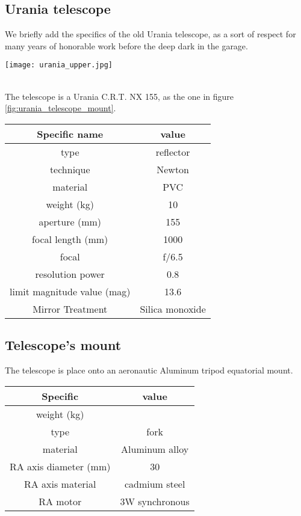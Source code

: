 \subsection{Urania telescope}
We briefly add the specifics of the old Urania telescope, as a sort of respect for many years of honorable work before the deep dark in the garage.
\\
\begin{minipage}{0.5\textwidth}
    \centering
    \texttt{[image: urania\_upper.jpg]}
    \label{fig:urania_telescope_mount}
\end{minipage}
\\
The telescope is a Urania C.R.T. NX 155, as the one in figure \ref{fig:urania_telescope_mount}.
\\
\begin{minipage}{0.5\textwidth}
    \centering
    \begin{tabular}{c|c}
        Specific name & value \\
        \hline
        type & reflector \\
        technique & Newton  \\
        material & PVC  \\
        weight (kg) & 10 \\
        aperture (mm) & 155 \\
        focal length (mm) & 1000 \\
        focal & f/6.5 \\
        resolution power & 0.8 \\
        limit magnitude value (mag) & 13.6 \\
        Mirror Treatment & Silica monoxide \\
        \hline
    \end{tabular}
\end{minipage}

\subsection{Telescope's mount}
The telescope is place onto an aeronautic Aluminum tripod equatorial mount.
\\
\begin{minipage}{.4\textwidth}
    \begin{tabular}{cc}
        Specific & value \\
        \hline
        weight (kg) & \\
        type & fork \\
        material & Aluminum alloy \\
        RA axis diameter (mm) & 30 \\
        RA axis material & cadmium steel \\
        RA motor & 3W synchronous \\
        \hline
    \end{tabular}
    \label{tab:mount}
\end{minipage}

